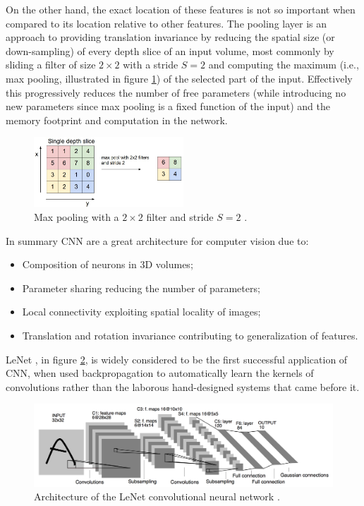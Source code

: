 On the other hand, the exact location of these features is not so important when compared to its location relative to other features. The pooling layer is an approach to providing translation invariance by reducing the spatial size (or down-sampling) of every depth slice of an input volume, most commonly by sliding a filter of size $2 \times 2$ with a stride $S = 2$ and computing the maximum (i.e., max pooling, illustrated in figure \ref{fig:maxpooling}) of the selected part of the input. Effectively this progressively reduces the number of free parameters (while introducing no new parameters since max pooling is a fixed function of the input) and the memory footprint and computation in the network.

\begin{figure}[ht]
    \centering
    \includegraphics[width=0.5\textwidth]{figs/maxpooling.png}
    \caption{Max pooling with a $2 \times 2$ filter and stride $S = 2$ \cite{cs231n}.}
    \label{fig:maxpooling}
\end{figure}

In summary \ac{CNN} are a great architecture for computer vision due to:

\begin{itemize}
    \item Composition of neurons in 3D volumes;
    \item Parameter sharing reducing the number of parameters;
    \item Local connectivity exploiting spatial locality of images;
    \item Translation and rotation invariance contributing to generalization of features.
\end{itemize}

LeNet \cite{lenet}, in figure \ref{fig:lenet}, is widely considered to be the first successful application of \ac{CNN}, when \citeauthor{lenet} used backpropagation to automatically learn the kernels of convolutions rather than the laborous hand-designed systems that came before it.

\begin{figure}[ht]
    \centering
    \includegraphics[width=1.0\textwidth]{figs/lenet.png}
    \caption{Architecture of the LeNet convolutional neural network \cite{lenet}.}
    \label{fig:lenet}
\end{figure}

